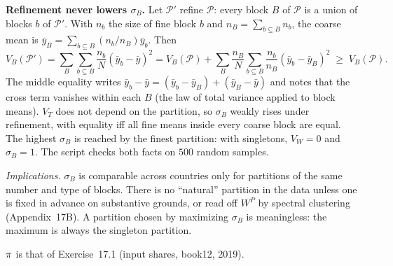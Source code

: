 \documentclass[../solutions_manual.tex]{subfiles}
\begin{document}
 \textbf{Refinement never lowers $\sigma_B$.} Let $\mathcal{P}'$ refine $\mathcal{P}$: every block $B$ of $\mathcal{P}$ is a union of blocks $b$ of $\mathcal{P}'$. With $n_b$ the size of fine block $b$ and $n_B = \sum_{b\subseteq B}n_b$, the coarse mean is $\bar y_B = \sum_{b\subseteq B}(n_b/n_B)\bar y_b$. Then
\[
\textstyle V_B(\mathcal{P}') = \sum_B\sum_{b\subseteq B}\frac{n_b}{N}(\bar y_b - \bar y)^2 = V_B(\mathcal{P}) + \sum_B\frac{n_B}{N}\sum_{b\subseteq B}\frac{n_b}{n_B}(\bar y_b - \bar y_B)^2 \;\ge\; V_B(\mathcal{P}).
\]
The middle equality writes $\bar y_b - \bar y = (\bar y_b - \bar y_B) + (\bar y_B - \bar y)$ and notes that the cross term vanishes within each $B$ (the law of total variance applied to block means). $V_T$ does not depend on the partition, so $\sigma_B$ weakly rises under refinement, with equality iff all fine means inside every coarse block are equal. The highest $\sigma_B$ is reached by the finest partition: with singletons, $V_W = 0$ and $\sigma_B = 1$. The script checks both facts on $500$ random samples.

\emph{Implications.} $\sigma_B$ is comparable across countries only for partitions of the same number and type of blocks. There is no ``natural'' partition in the data unless one is fixed in advance on substantive grounds, or read off $W^P$ by spectral clustering (Appendix~17B). A partition chosen by maximizing $\sigma_B$ is meaningless: the maximum is always the singleton partition.


 $\pi$ is that of Exercise~17.1 (input shares, book12, 2019).
\end{document}
